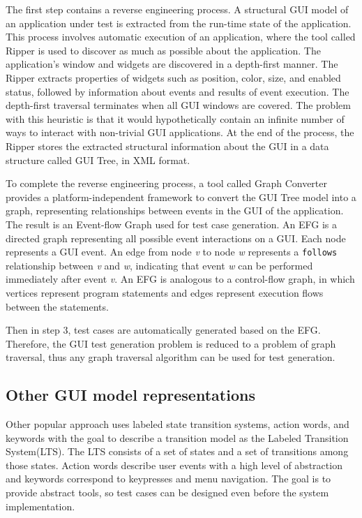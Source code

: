 The first step contains a reverse engineering process. A structural GUI model of an application under test is extracted from the run-time state of the application. This process involves automatic execution of an application, where the tool called Ripper is used to discover as much as possible about the application. The application's window and widgets are discovered in a depth-first manner. The Ripper extracts properties of widgets such as position, color, size, and enabled status, followed by information about events and results of event execution. The depth-first traversal terminates when all GUI windows are covered. The problem with this heuristic is that it would hypothetically contain an infinite number of ways to interact with non-trivial GUI applications. At the end of the process, the Ripper stores the extracted structural information about the GUI in a data structure called GUI Tree, in XML format.

To complete the reverse engineering process, a tool called Graph Converter provides a platform-independent framework to convert the GUI Tree model into a graph, representing relationships between events in the GUI of the application. The result is an Event-flow Graph used for test case generation.
An EFG is a directed graph representing all possible event interactions on a GUI. Each node represents a GUI event. An edge from node \textit{v} to node \textit{w} represents a \verb|follows| relationship between \textit{v} and \textit{w}, indicating that event \textit{w} can be performed immediately after event \textit{v}. An EFG is analogous to a control-flow graph, in which vertices represent program statements and edges represent execution flows between the statements.

Then in step 3, test cases are automatically generated based on the EFG. Therefore, the GUI test generation problem is reduced to a problem of graph traversal, thus any graph traversal algorithm can be used for test generation. 

\subsection{Other GUI model representations}

Other popular approach uses labeled state transition systems, action words, and keywords with the goal to describe a transition model as the Labeled Transition System(LTS). The LTS consists of a set of states and a set of transitions among those states. Action words describe user events with a high level of abstraction and keywords correspond to keypresses and menu navigation. The goal is to provide abstract tools, so test cases can be designed even before the system implementation. 

